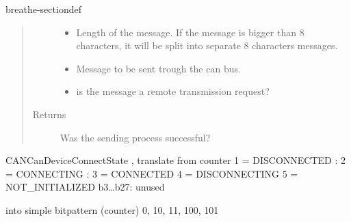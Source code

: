 \documentclass[a4paper,10pt,english]{sphinxmanual}
\begin{document}
\begin{fulllineitems}
\begin{sphinxuseclass}{breathe-sectiondef}
\begin{fulllineitems}
\begin{quote}
\begin{description}
\begin{itemize}
\item {} 
\sphinxAtStartPar
{} \textendash{} Length of the message. If the message is bigger than 8 characters, it will be split into separate 8 characters messages. 

\item {} 
\sphinxAtStartPar
{} \textendash{} Message to be sent trough the can bus. 

\item {} 
\sphinxAtStartPar
{} \textendash{} is the message a remote transmission request? 

\end{itemize}

\item[{Returns}] \leavevmode
\sphinxAtStartPar
Was the sending process successful? 

\end{description}\end{quote}

\end{fulllineitems}


\begin{fulllineitems}
\label{\detokenize{classesdetails:_CPPv4N10AnaCanScan13getPortStatusEv}}%
\pysigstartmultiline
{}%
\pysigstopmultiline
\sphinxAtStartPar
CANCanDeviceConnectState , translate from counter 1 = DISCONNECTED : 2 = CONNECTING : 3 = CONNECTED 4 = DISCONNECTING 5 = NOT\_INITIALIZED b3…b27: unused

\sphinxAtStartPar
into simple bitpattern (counter) 0, 10, 11, 100, 101 

\end{fulllineitems}


\end{sphinxuseclass}
\end{fulllineitems}

\end{document}
